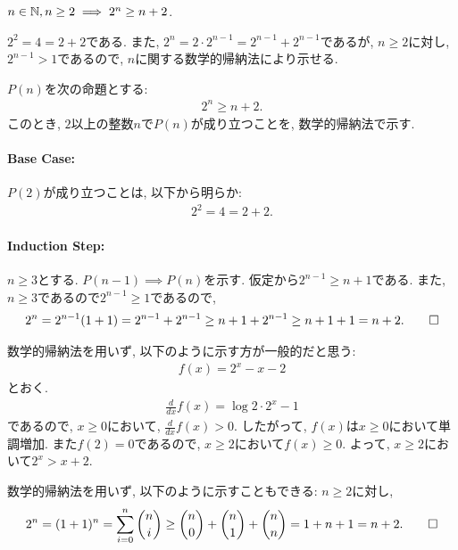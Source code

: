 \begin{prop}
  \label{p:20230809}
  $n\in\mathbb{N}, n\geq 2\implies 2^n \geq n+2$.
\end{prop}
\begin{proof**}
  $2^2=4=2+2$である.
  また,
  $2^n=2\cdot 2^{n-1}=2^{n-1}+2^{n-1}$であるが,
  $n\geq 2$に対し,
  $2^{n-1} > 1$であるので,
  $n$に関する数学的帰納法により示せる.
\end{proof**}
\begin{proof*}
  $P(n)$を次の命題とする:
  \begin{align*}
    2^n \geq n+2
    .
  \end{align*}
  このとき,
  $2$以上の整数$n$で$P(n)$が成り立つことを,
  数学的帰納法で示す.

  \paragraph{Base Case:}
  $P(2)$が成り立つことは, 以下から明らか:
  \begin{align*}
    2^2=4=2+2.
  \end{align*}
  \paragraph{Induction Step:}
  $n\geq 3$とする.
  $P(n-1)\implies P(n)$を示す.
  仮定から$2^{n-1}\geq n+1$である.
  また, $n\geq 3$であるので$2^{n-1}\geq 1$であるので,
  \begin{align*}
    2^n=2^{n-1}(1+1)=2^{n-1}+2^{n-1}\geq n+1+2^{n-1}\geq n+1+1=n+2
    .\qedhere
  \end{align*}
\end{proof*}

\begin{rem}
  数学的帰納法を用いず, 以下のように示す方が一般的だと思う:
  \begin{align*}
    f(x)=2^x-x-2
  \end{align*}
  とおく.
  \begin{align*}
    \frac{d}{dx}f(x)=\log 2 \cdot 2^x-1
  \end{align*}
  であるので, $x\geq 0$において, $\frac{d}{dx}f(x)> 0$.
  したがって, $f(x)$は$x\geq 0$において単調増加.
  また$f(2)=0$であるので,
  $x\geq 2$において$f(x)\geq 0$.
  よって, $x\geq 2$において$2^x>x+2$.
\end{rem}

\begin{rem}
  数学的帰納法を用いず, 以下のように示すこともできる:
  $n\geq 2$に対し,
  \begin{align*}
    2^n=(1+1)^n=\sum_{i=0}^n \binom{n}{i}\geq \binom{n}{0}+\binom{n}{1}+\binom{n}{n}=1+n+1=n+2
    .\qedhere
  \end{align*}
\end{rem}

